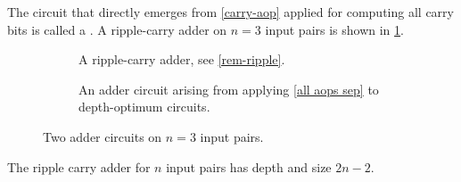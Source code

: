 The circuit that directly emerges from \cref{carry-aop} applied for computing all carry bits
is called a .
A ripple-carry adder on $n = 3$ input pairs is shown in
\cref{fig-simple-adders-1}.

 \begin{figure}[ht!]
  \begin{center}
   \newcommand{\localwidth}{0.42\textwidth}
   \hfill{}
   \begin{subfigure}[t]{\localwidth}
    \begin{center}
     \caption{A ripple-carry adder, see \cref{rem-ripple}.}
     \label{fig-simple-adders-1}
    \end{center}
   \end{subfigure}
   \hfill{}
   \begin{subfigure}[t]{\localwidth}
    \begin{center}
     \caption{An adder circuit arising from applying \cref{all aops sep}
        to depth-optimum \aop{} circuits.}
     \label{fig-simple-adders-2}
    \end{center}
   \end{subfigure}
   \hfill{}
   \caption{Two adder circuits on $n = 3$ input pairs.}
   \label{fig-simple-adders}
  \end{center}
 \end{figure}

\begin{observation} \label{rem-ripple}
 The ripple carry adder for $n$ input pairs has depth and size $2n - 2$.
\end{observation}

